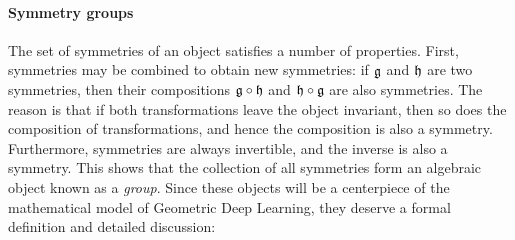 \paragraph{Symmetry groups}
The set of symmetries of an object satisfies a number of properties. 
First, symmetries may be combined to obtain new symmetries: if ${\mathfrak{g}}$ and ${\mathfrak{h}}$ are two symmetries,
then their  compositions ${\mathfrak{g}} \circ {\mathfrak{h}}$ and ${\mathfrak{h}} \circ {\mathfrak{g}}$
 are also symmetries.
The reason is that if both transformations leave the object invariant, then so does the composition of transformations, and hence the composition is also a symmetry.
Furthermore, symmetries are always invertible, and the inverse is also a symmetry.
This shows that the collection of all symmetries form an algebraic object known as a {\em group}. Since these objects will be a centerpiece of the mathematical model of Geometric Deep Learning, they deserve a formal definition and detailed discussion:




